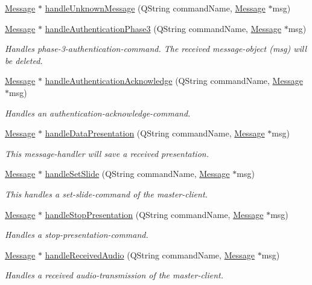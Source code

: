 \begin{DoxyCompactItemize}
\hyperlink{class_message}{Message} $\ast$ \hyperlink{class_server_appl_1_1_master_a0cc4e6596d4c3d39eb8f6c993cc7340c}{handle\+Unknown\+Message} (Q\+String command\+Name, \hyperlink{class_message}{Message} $\ast$msg)
\item 
\hyperlink{class_message}{Message} $\ast$ \hyperlink{class_server_appl_1_1_master_a30f777abbc8337283960281b3cd8038b}{handle\+Authentication\+Phase3} (Q\+String command\+Name, \hyperlink{class_message}{Message} $\ast$msg)
\begin{DoxyCompactList}\small\item\em Handles phase-\/3-\/authentication-\/command. The received message-\/object (msg) will be deleted. \end{DoxyCompactList}\item 
\hyperlink{class_message}{Message} $\ast$ \hyperlink{class_server_appl_1_1_master_aa472caffc168d575b620384b598f6a02}{handle\+Authentication\+Acknowledge} (Q\+String command\+Name, \hyperlink{class_message}{Message} $\ast$msg)
\begin{DoxyCompactList}\small\item\em Handles an authentication-\/acknowledge-\/command. \end{DoxyCompactList}\item 
\hyperlink{class_message}{Message} $\ast$ \hyperlink{class_server_appl_1_1_master_ad2a85c966d163e8466f1a2da8a722553}{handle\+Data\+Presentation} (Q\+String command\+Name, \hyperlink{class_message}{Message} $\ast$msg)
\begin{DoxyCompactList}\small\item\em This message-\/handler will save a received presentation. \end{DoxyCompactList}\item 
\hyperlink{class_message}{Message} $\ast$ \hyperlink{class_server_appl_1_1_master_ab4f3a44c0eb7f236783acd41435febf1}{handle\+Set\+Slide} (Q\+String command\+Name, \hyperlink{class_message}{Message} $\ast$msg)
\begin{DoxyCompactList}\small\item\em This handles a set-\/slide-\/command of the master-\/client. \end{DoxyCompactList}\item 
\hyperlink{class_message}{Message} $\ast$ \hyperlink{class_server_appl_1_1_master_a4c13d447ddde25f16dc654688e82ef3e}{handle\+Stop\+Presentation} (Q\+String command\+Name, \hyperlink{class_message}{Message} $\ast$msg)
\begin{DoxyCompactList}\small\item\em Handles a stop-\/presentation-\/command. \end{DoxyCompactList}\item 
\hyperlink{class_message}{Message} $\ast$ \hyperlink{class_server_appl_1_1_master_a1e7730e5e9374205d55050e274ad2771}{handle\+Received\+Audio} (Q\+String command\+Name, \hyperlink{class_message}{Message} $\ast$msg)
\begin{DoxyCompactList}\small\item\em Handles a received audio-\/transmission of the master-\/client. \end{DoxyCompactList}\end{DoxyCompactItemize}
